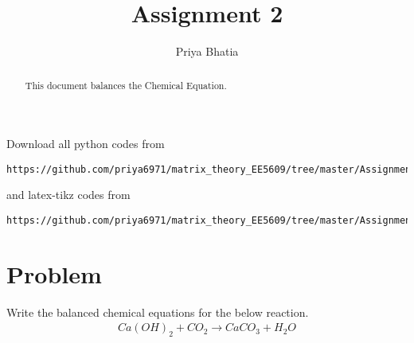 \documentclass[journal,12pt,twocolumn]{IEEEtran}
\begin{document}
     \def\rightbox#1{\makebox[0in][r]{#1}}
     \def\centbox#1{\makebox[0in]{#1}}
     \def\topbox#1{\raisebox{-\baselineskip}[0in][0in]{#1}}
     \def\midbox#1{\raisebox{-0.5\baselineskip}[0in][0in]{#1}}
\vspace{3cm}
\title{Assignment 2}
\author{Priya Bhatia}
\maketitle
\newpage
\bigskip
\renewcommand{\thefigure}{\theenumi}
\renewcommand{\thetable}{\theenumi}
\begin{abstract}
This document balances the Chemical Equation.
\end{abstract}
Download all python codes from
\begin{lstlisting}
https://github.com/priya6971/matrix_theory_EE5609/tree/master/Assignment2/code
\end{lstlisting}
%
and latex-tikz codes from
%
\begin{lstlisting}
https://github.com/priya6971/matrix_theory_EE5609/tree/master/Assignment2
\end{lstlisting}
%
\section{Problem}
Write the balanced chemical equations for the below reaction.
\begin{align}\label{1}
    Ca(OH)_2 + CO_2 \xrightarrow{} CaCO_3 + H_2O
\end{align}
\end{document}
